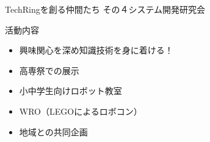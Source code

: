 \documentclass[dvipdfmx]{beamer}
\begin{document}
\begin{frame}{TechRingを創る仲間たち その４}{システム開発研究会}
  
  \begin{minipage}{0.85\textwidth}
    \begin{block}{活動内容}
      \begin{itemize}
        \item 興味関心を深め知識技術を身に着ける！
        \item 高専祭での展示
        \item 小中学生向けロボット教室
        \item WRO（LEGOによるロボコン）
        \item 地域との共同企画
      \end{itemize}
    \end{block}
  \end{minipage}


\end{frame}
\end{document}
